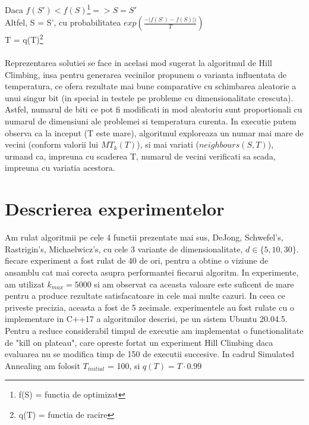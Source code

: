 \documentclass{article}
\begin{document}
\hspace*{10mm}\hspace*{10mm} Daca $f(S') < f(S)$\footnote{f(S) = functia de optimizat}$ => S = S'$\\
\hspace*{10mm}\hspace*{10mm} Altfel, S = S', cu probabilitatea $exp(\frac{-|f(S’)-f(S)|)}{T})$\\
\hspace*{10mm} T = q(T)\footnote{q(T) = functia de racire}\\\\
Reprezentarea solutiei se face in acelasi mod sugerat la algoritmul de Hill Climbing, insa pentru generarea vecinilor propunem o varianta influentata de temperatura, ce ofera rezultate mai bune comparative cu schimbarea aleatorie a unui singur bit (in special in testele pe probleme cu dimensionalitate crescuta). Astfel, numarul de biti ce pot fi modificati in mod aleatoriu  sunt proportionali cu numarul de dimensiuni ale problemei si temperatura curenta. In executie putem observa ca la inceput (T este mare), algoritmul exploreaza un numar mai mare de vecini (conform valorii lui $MT_k(T)$), si mai variati ($neighbours(S,T)$), urmand ca, impreuna cu scaderea T, numarul de vecini verificati sa scada, impreuna cu variatia acestora.
\section{Descrierea experimentelor}
Am rulat algoritmii pe cele 4 functii prezentate mai sus, DeJong, Schwefel’s, Rastrigin’s, Michaelwicz’s, cu cele 3 variante de dimensionalitate, $d \in \{5, 10, 30\}$. fiecare experiment a fost rulat de 40 de ori, pentru a obtine o viziune de ansamblu cat mai corecta asupra performantei fiecarui algoritm. In experimente, am utilizat $k_{max} = 5000$ si am observat ca aceasta valoare este suficent de mare pentru a produce rezultate satisfacatoare in cele mai multe cazuri. In ceea ce priveste precizia, aceasta a fost de 5 zecimale. experimentele au fost rulate cu o implementare in C++17 a algoritmilor descrisi, pe un sistem Ubuntu 20.04.5. Pentru a reduce considerabil timpul de executie am implementat o functionalitate de "kill on plateau", care opreste fortat un experiment Hill Climbing daca evaluarea nu se modifica timp de 150 de executii succesive. In cadrul Simulated Annealing am folosit $T_{initial}$ = 100, si $q(T) = T \cdot 0.99$
\end{document}
